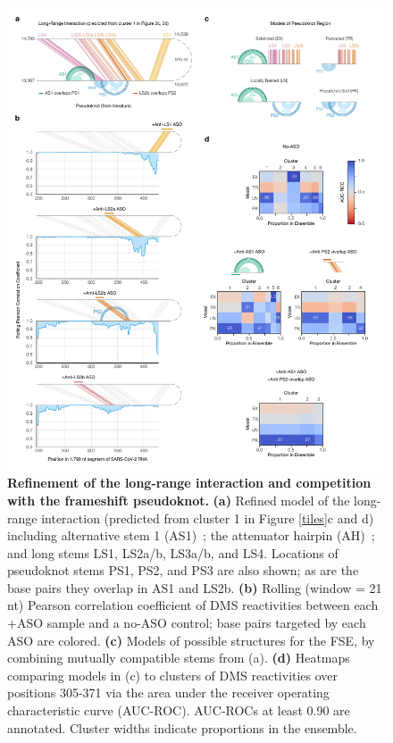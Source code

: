 \documentclass[main.tex]{subfiles}
\begin{document}
\begin{figure}[H]
	\includegraphics[width=\textwidth]{../MainFigures/lnas/lnas.pdf}
	\caption{\textbf{Refinement of the long-range interaction and competition with the frameshift pseudoknot.} \textbf{(a)} Refined model of the long-range interaction (predicted from cluster 1 in Figure \ref{tiles}c and d) including alternative stem 1 (AS1)~\cite{Lan2022}; the attenuator hairpin (AH)~\cite{Su2005}; and long stems LS1, LS2a/b, LS3a/b, and LS4. Locations of pseudoknot stems PS1, PS2, and PS3 are also shown; as are the base pairs they overlap in AS1 and LS2b. \textbf{(b)} Rolling (window = 21 nt) Pearson correlation coefficient of DMS reactivities between each +ASO sample and a no-ASO control; base pairs targeted by each ASO are colored. \textbf{(c)} Models of possible structures for the FSE, by combining mutually compatible stems from (a). \textbf{(d)} Heatmaps comparing models in (c) to clusters of DMS reactivities over positions 305-371 via the area under the receiver operating characteristic curve (AUC-ROC). AUC-ROCs at least 0.90 are annotated. Cluster widths indicate proportions in the ensemble.}
	\label{lnas}
\end{figure}
\end{document}
